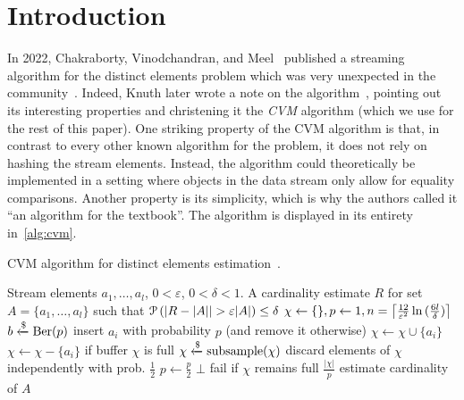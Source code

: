 \section{Introduction}
\label{sec:intro}

In 2022, Chakraborty, Vinodchandran, and Meel~\cite{chakraborty2022} published a streaming algorithm for the distinct elements problem which was very unexpected in the community~\cite{quanta}.
Indeed, Knuth later wrote a note on the algorithm~\cite{knuthnote}, pointing out its interesting properties and christening it the \emph{CVM} algorithm (which we use for the rest of this paper).
One striking property of the CVM algorithm is that, in contrast to every other known algorithm for the problem, it does not rely on hashing the stream elements.
Instead, the algorithm could theoretically be implemented in a setting where objects in the data stream only allow for equality comparisons.
Another property is its simplicity, which is why the authors called it ``an algorithm for the textbook''.
The algorithm is displayed in its entirety in~\cref{alg:cvm}.

\begin{algorithm}[h!]
	\caption{CVM algorithm for distinct elements estimation~\cite{chakraborty2022}.}\label{alg:cvm}
	\begin{algorithmic}[1]
  \Require Stream elements $a_1,\dots,a_l$, $0 < \varepsilon$, $0 < \delta < 1$.
  \Ensure A cardinality estimate $R$ for set $A = \{ a_1,\dots,a_l \}$ such that $\prob \left( |R - |A| | > \varepsilon |A| \right) \leq \delta$
  \State $\chi \gets \{\}, p \gets 1, n = \ceil*{\frac{12}{\varepsilon^2} \ln{(\frac{6l}{\delta})} }$
    \State $b \getsr \Ber(p)$ \Comment insert $a_i$ with probability $p$ (and remove it otherwise)
      \State $\chi \gets \chi \cup \{a_i\}$
    \Else
      \State $\chi \gets \chi - \{a_i\}$
    \EndIf
     \Comment if buffer $\chi$ is full
      \State $\chi \getsr \mathrm{subsample}(\chi)$ \Comment discard elements of $\chi$ independently with prob. $\frac{1}{2}$
      \State $p \gets \frac{p}{2}$
    \EndIf
      \Return $\bot$ \Comment fail if $\chi$ remains full
    \EndIf
  \EndFor
  \State \Return $\frac{|\chi|}{p}$ \Comment estimate cardinality of $A$
  \end{algorithmic}
\end{algorithm}

